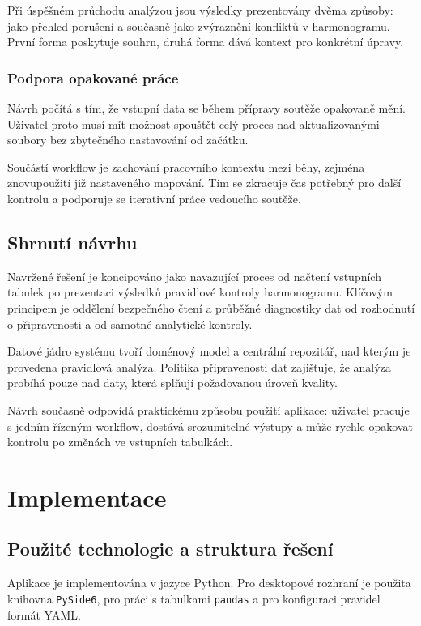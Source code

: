 \documentclass[czech, kiv, ba, he, iso690alph, pdf]{fasthesis}
\begin{document}
				Při úspěšném průchodu analýzou jsou výsledky prezentovány dvěma způsoby: jako přehled porušení a současně jako zvýraznění konfliktů v harmonogramu. První forma poskytuje souhrn, druhá forma dává kontext pro konkrétní úpravy.
	
			\subsection{Podpora opakované práce}
				Návrh počítá s tím, že vstupní data se během přípravy soutěže opakovaně mění. Uživatel proto musí mít možnost spouštět celý proces nad aktualizovanými soubory bez zbytečného nastavování od začátku.
	
				Součástí workflow je zachování pracovního kontextu mezi běhy, zejména znovupoužití již nastaveného mapování. Tím se zkracuje čas potřebný pro další kontrolu a podporuje se iterativní práce vedoucího soutěže.
	
		\section{Shrnutí návrhu}
			Navržené řešení je koncipováno jako navazující proces od načtení vstupních tabulek po prezentaci výsledků pravidlové kontroly harmonogramu. Klíčovým principem je oddělení bezpečného čtení a průběžné diagnostiky dat od rozhodnutí o připravenosti a od samotné analytické kontroly.
	
			Datové jádro systému tvoří doménový model a centrální repozitář, nad kterým je provedena pravidlová analýza. Politika připravenosti dat zajišťuje, že analýza probíhá pouze nad daty, která splňují požadovanou úroveň kvality.
	
			Návrh současně odpovídá praktickému způsobu použití aplikace: uživatel pracuje s jedním řízeným workflow, dostává srozumitelné výstupy a může rychle opakovat kontrolu po změnách ve vstupních tabulkách.

	\chapter{Implementace}
	
		\section{Použité technologie a struktura řešení}
			Aplikace je implementována v jazyce Python. Pro desktopové rozhraní je použita knihovna \texttt{PySide6}, pro práci s tabulkami \texttt{pandas} a pro konfiguraci pravidel formát YAML.
	
\end{document}
